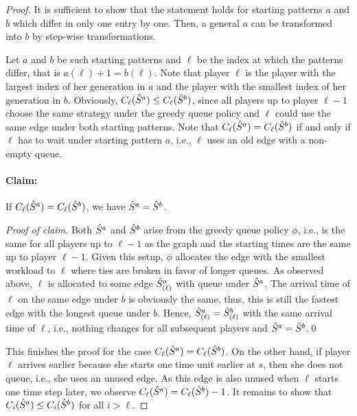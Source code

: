 \begin{proof}
It is sufficient to show that the statement holds for starting patterns $a$ and $b$ which differ in only one entry by one. Then, a general $a$ can be transformed into $b$ by step-wise transformations. 

Let $a$ and $b$ be such starting patterns and $\ell$ be the index at which the patterns differ, that is $a(\ell)+1=b(\ell)$. Note that player $\ell$ is the player with the largest index of her generation in $a$ and the player with the smallest index of her generation in $b$. Obviously, $C_{\ell}(\hat{S}^a)\le C_{\ell}(\hat{S}^b)$, since all players up to player $\ell-1$ choose the same strategy under the greedy queue policy and $\ell$ could use the same edge under both starting patterns. Note that $C_\ell(\hat{S}^a) = C_\ell(\hat{S}^b)$ if and only if $\ell$ has to wait under starting pattern $a$, i.e., $\ell$ uses an old edge with a non-empty queue.

\paragraph{Claim:} If $C_\ell(\hat{S}^a) = C_\ell(\hat{S}^b)$, we have $\hat{S}^a = \hat{S}^b$.

\noindent \textit{Proof of claim.} Both $\hat{S}^a$ and $\hat{S}^b$ arise from the greedy queue policy $\phi$, i.e., is the same for all players up to $\ell-1$ as the graph and the starting times are the same up to player $\ell-1$. Given this setup, $\phi$ allocates the edge with the smallest workload to $\ell$ where ties are broken in favor of longer queues. As observed above, $\ell$ is allocated to some edge $\hat{S}^a_{(\ell)}$ with queue under $\hat{S}^a$. The arrival time of $\ell$ on the same edge under $b$ is obviously the same, thus, this is still the fastest edge with the longest queue under $b$. Hence, $\hat{S}^a_{(\ell)} = \hat{S}^b_{(\ell)}$ with the same arrival time of $\ell$, i.e., nothing changes for all subsequent players and $\hat{S}^a = \hat{S}^b$.\qed

\medskip
%
\noindent This finishes the proof for the case $C_\ell(\hat{S}^a) = C_\ell(\hat{S}^b)$.
On the other hand, if player $\ell$ arrives earlier because she starts one time unit earlier at $s$, then she does not queue, i.e., she uses an unused edge. As this edge is also unused when $\ell$ starts one time step later, we observe $C_\ell(\hat{S}^a) = C_\ell(\hat{S}^b) -1$. It remains to show that $C_i(\hat{S}^a) \leq C_i(\hat{S}^b)$ for all $i > \ell$. 


\end{proof}
